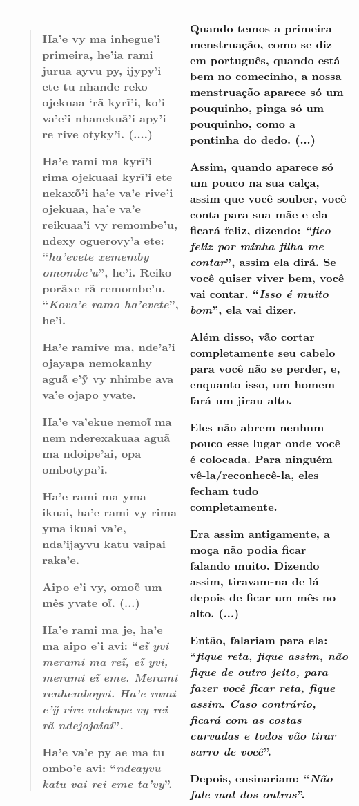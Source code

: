 \begin{longtable}[]{@{}ll@{}}
\toprule
\begin{minipage}[t]{0.48\columnwidth}\raggedright\strut
\begin{quote}
Ha'e vy ma inhegue'i primeira, he'ia rami jurua ayvu py, ijypy'i ete tu
nhande reko ojekuaa `rã kyrĩ'i, ko'i va'e'i nhanekuã'i apy'i re rive
otyky'i. (....)

Ha'e rami ma kyrĩ'i rima ojekuaai kyrĩ'i ete nekaxõ'i ha'e va'e rive'i
ojekuaa, ha'e va'e reikuaa'i vy remombe'u, ndexy oguerovy'a ete:
``\emph{ha'evete xememby omombe'u}'', he'i. Reiko porãxe rã remombe'u.
``\emph{Kova'e ramo ha'evete}'', he'i.

Ha'e ramive ma, nde'a'i ojayapa nemokanhy aguã e'ỹ vy nhimbe ava va'e
ojapo yvate.

Ha'e va'ekue nemoĩ ma nem nderexakuaa aguã ma ndoipe'ai, opa ombotypa'i.

Ha'e rami ma yma ikuai, ha'e rami vy rima yma ikuai va'e, nda'ijayvu
katu vaipai raka'e.

Aipo e'i vy, omoẽ um mês yvate oĩ. (...)

Ha'e rami ma je, ha'e ma aipo e'i avi: ``\emph{eĩ yvi merami ma reĩ, eĩ
yvi, merami eĩ eme. Merami renhemboyvi. Ha'e rami e'ỹ rire ndekupe vy
rei rã ndejojaiai}''\emph{. }

Ha'e va'e py ae ma tu ombo'e avi: ``\emph{ndeayvu katu vai rei eme
ta'vy}''.
\end{quote}\strut
\end{minipage} & \begin{minipage}[t]{0.48\columnwidth}\raggedright\strut
Quando temos a primeira menstruação, como se diz em português, quando
está bem no comecinho, a nossa menstruação aparece só um pouquinho,
pinga só um pouquinho, como a pontinha do dedo. (...)

Assim, quando aparece só um pouco na sua calça, assim que você souber,
você conta para sua mãe e ela ficará feliz, dizendo: \emph{``fico feliz
por minha filha me contar}'', assim ela dirá. Se você quiser viver bem,
você vai contar. ``\emph{Isso é muito bom}'', ela vai dizer.

Além disso, vão cortar completamente seu cabelo para você não se perder,
e, enquanto isso, um homem fará um jirau alto.

Eles não abrem nenhum pouco esse lugar onde você é colocada. Para
ninguém vê-la/reconhecê-la, eles fecham tudo completamente.

Era assim antigamente, a moça não podia ficar falando muito. Dizendo
assim, tiravam-na de lá depois de ficar um mês no alto. (...)

Então, falariam para ela: ``\emph{fique reta, fique assim, não fique de
outro jeito, para fazer você ficar reta, fique assim}. \emph{Caso
contrário, ficará com as costas curvadas e todos vão tirar sarro de
você}''.

Depois, ensinariam: ``\emph{Não fale mal dos outros}''.\strut
\end{minipage}\tabularnewline
\bottomrule
\end{longtable}

